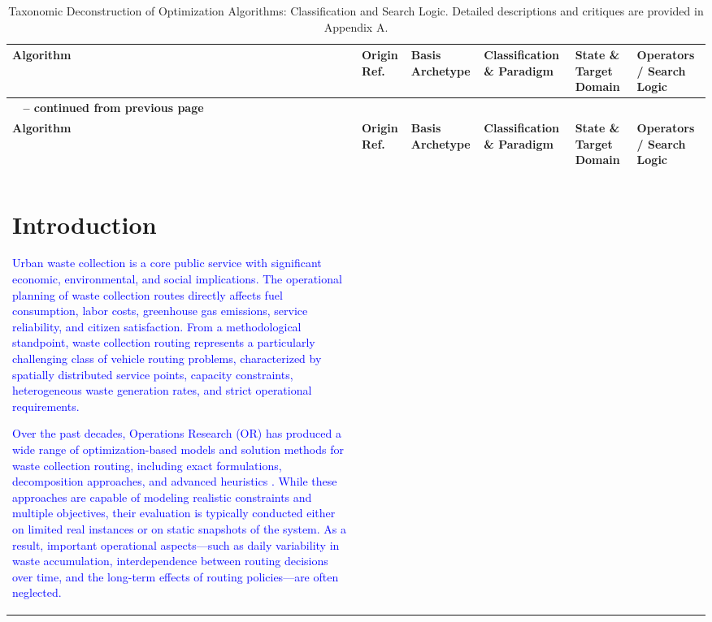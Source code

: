 \documentclass[orivec,runningheads]{llncs}
\begin{document}
\begin{center}
\scriptsize
\renewcommand{\arraystretch}{1.3}
\begin{longtable}{
  >{\raggedright\arraybackslash}p{}
  >{\raggedright\arraybackslash}p{}
  >{\raggedright\arraybackslash}p{}
  >{\raggedright\arraybackslash}p{}
  >{\raggedright\arraybackslash}p{}
  >{\raggedright\arraybackslash}p{}
}
\caption{Taxonomic Deconstruction of Optimization Algorithms: Classification and Search Logic. Detailed descriptions and critiques are provided in Appendix A.} \label{tab:main_taxonomy} \\
\toprule
\textbf{Algorithm} & \textbf{Origin Ref.} & \textbf{Basis Archetype} & \textbf{Classification \& Paradigm} & \textbf{State \& Target Domain} & \textbf{Operators / Search Logic} \\
\midrule
\endfirsthead

\multicolumn{6}{c}%
{{\bfseries \tablename\ \thetable{} -- continued from previous page}} \\
\toprule
\textbf{Algorithm} & \textbf{Origin Ref.} & \textbf{Basis Archetype} & \textbf{Classification \& Paradigm} & \textbf{State \& Target Domain} & \textbf{Operators / Search Logic} \\
\midrule
\endhead

\midrule \multicolumn{6}{r}{{Continued on next page}} \\
\endfoot

\bottomrule
\endlastfoot

\section{Introduction}

\textcolor{blue}{Urban waste collection is a core public service with significant economic, environmental, and social implications. The operational planning of waste collection routes directly affects fuel consumption, labor costs, greenhouse gas emissions, service reliability, and citizen satisfaction. From a methodological standpoint, waste collection routing represents a particularly challenging class of vehicle routing problems, characterized by spatially distributed service points, capacity constraints, heterogeneous waste generation rates, and strict operational requirements.
}

\textcolor{blue}{Over the past decades, Operations Research (OR) has produced a wide range of optimization-based models and solution methods for waste collection routing, including exact formulations, decomposition approaches, and advanced heuristics \cite{hess2024waste,jorge2022hybrid,lopes2023efficient,de2024data}. While these approaches are capable of modeling realistic constraints and multiple objectives, their evaluation is typically conducted either on limited real instances or on static snapshots of the system. As a result, important operational aspects—such as daily variability in waste accumulation, interdependence between routing decisions over time, and the long-term effects of routing policies—are often neglected.}


\end{longtable}
\end{center}
\end{document}
